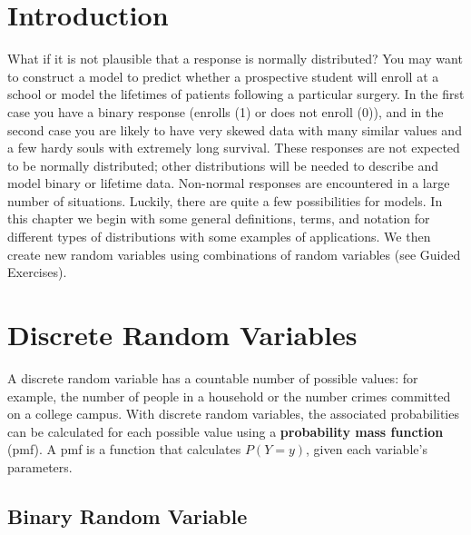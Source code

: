 \documentclass[
]{krantz}
\begin{document}
\hypertarget{introduction}{%
\section{Introduction}\label{introduction}}

What if it is not plausible that a response is normally distributed? You may want to construct a model to predict whether a prospective student will enroll at a school or model the lifetimes of patients following a particular surgery. In the first case you have a binary response (enrolls (1) or does not enroll (0)), and in the second case you are likely to have very skewed data with many similar values and a few hardy souls with extremely long survival. These responses are not expected to be normally distributed; other distributions will be needed to describe and model binary or lifetime data. Non-normal responses are encountered in a large number of situations. Luckily, there are quite a few possibilities for models. In this chapter we begin with some general definitions, terms, and notation for different types of distributions with some examples of applications. We then create new random variables using combinations of random variables (see Guided Exercises).

\hypertarget{discrete-random-variables}{%
\section{Discrete Random Variables}\label{discrete-random-variables}}

A discrete random variable has a countable number of possible values: for example, the number of people in a household or the number crimes committed on a college campus. With discrete random variables, the associated probabilities can be calculated for each possible value using a \textbf{probability mass function} (pmf). A pmf is a function that calculates \(P(Y=y)\), given each variable's parameters.

\hypertarget{sec-binary}{%
\subsection{Binary Random Variable}\label{sec-binary}}
\end{document}
